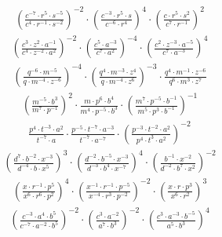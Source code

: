 \begin{align}
\left(\frac{c^{-7}\cdot r^{5}\cdot s^{-5}}{c^{4}\cdot r^{-1}\cdot s^{-2}}\right)^{-2}\cdot \left(\frac{c^{-3}\cdot r^{5}\cdot s}{c^{-6}\cdot r^{4}}\right)^{4}\cdot \left(\frac{c\cdot r^{5}\cdot s^{2}}{c^{7}\cdot r^{-1}}\right)^{2}
\end{align}
\begin{align}
\left(\frac{c^{3}\cdot z^{2}\cdot a^{-1}}{c^{4}\cdot z^{-2}\cdot a^{2}}\right)^{-2}\cdot \left(\frac{c^{5}\cdot a^{-3}}{c^{7}\cdot a^{2}}\right)^{-4}\cdot \left(\frac{c^{2}\cdot z^{-3}\cdot a^{-5}}{c^{7}\cdot a^{-3}}\right)^{4}
\end{align}
\begin{align}
\left(\frac{q^{-6}\cdot m^{-5}}{q\cdot m^{-4}\cdot z^{-6}}\right)^{-4}\cdot \left(\frac{q^{4}\cdot m^{-3}\cdot z^{4}}{q\cdot m^{-4}\cdot z^{6}}\right)^{-3}\cdot \frac{q^{4}\cdot m^{-1}\cdot z^{-6}}{q^{6}\cdot m^{3}\cdot z^{7}}
\end{align}
\begin{align}
\left(\frac{m^{-5}\cdot b^{3}}{m^{7}\cdot p^{-1}}\right)^{2}\cdot \frac{m\cdot p^{6}\cdot b^{4}}{m^{4}\cdot p^{-5}\cdot b^{3}}\cdot \left(\frac{m^{7}\cdot p^{-5}\cdot b^{-1}}{m^{5}\cdot p^{3}\cdot b^{-1}}\right)^{-1}
\end{align}
\begin{align}
\frac{p^{4}\cdot t^{-3}\cdot a^{2}}{t^{-7}\cdot a}\cdot \frac{p^{-5}\cdot t^{-7}\cdot a^{-3}}{t^{-7}\cdot a^{-7}}\cdot \left(\frac{p^{-3}\cdot t^{-2}\cdot a^{2}}{p^{4}\cdot t^{3}\cdot a^{2}}\right)^{-2}
\end{align}
\begin{align}
\left(\frac{d^{7}\cdot b^{-2}\cdot x^{-3}}{d^{-4}\cdot b\cdot x^{5}}\right)^{3}\cdot \left(\frac{d^{-2}\cdot b^{-5}\cdot x^{-3}}{d^{-3}\cdot b^{4}\cdot x^{-7}}\right)^{4}\cdot \left(\frac{b^{-1}\cdot x^{-2}}{d^{-2}\cdot b^{7}\cdot x^{2}}\right)^{-2}
\end{align}
\begin{align}
\left(\frac{x\cdot r^{-1}\cdot p^{5}}{x^{6}\cdot r^{6}\cdot p^{2}}\right)^{4}\cdot \left(\frac{x^{-1}\cdot r^{-1}\cdot p^{-5}}{x^{-4}\cdot r^{3}\cdot p^{-2}}\right)^{-2}\cdot \left(\frac{x\cdot r\cdot p^{3}}{x^{6}\cdot r^{2}}\right)^{3}
\end{align}
\begin{align}
\left(\frac{c^{-3}\cdot a^{4}\cdot b^{5}}{c^{-7}\cdot a^{-2}\cdot b^{5}}\right)^{-2}\cdot \left(\frac{c^{3}\cdot a^{-2}}{a^{7}\cdot b^{3}}\right)^{-2}\cdot \left(\frac{c^{3}\cdot a^{-3}\cdot b^{-5}}{a^{5}\cdot b^{3}}\right)^{4}
\end{align}
